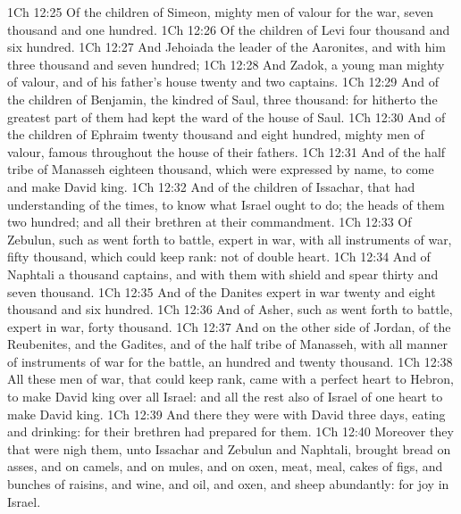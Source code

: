 \vs 1Ch 12:25 Of the children of Simeon, mighty men of valour for the war, seven thousand and one hundred.
\vs 1Ch 12:26 Of the children of Levi four thousand and six hundred.
\vs 1Ch 12:27 And Jehoiada  the leader of the Aaronites, and with him  three thousand and seven hundred;
\vs 1Ch 12:28 And Zadok, a young man mighty of valour, and of his father's house twenty and two captains.
\vs 1Ch 12:29 And of the children of Benjamin, the kindred of Saul, three thousand: for hitherto the greatest part of them had kept the ward of the house of Saul.
\vs 1Ch 12:30 And of the children of Ephraim twenty thousand and eight hundred, mighty men of valour, famous throughout the house of their fathers.
\vs 1Ch 12:31 And of the half tribe of Manasseh eighteen thousand, which were expressed by name, to come and make David king.
\vs 1Ch 12:32 And of the children of Issachar,  that had understanding of the times, to know what Israel ought to do; the heads of them  two hundred; and all their brethren  at their commandment.
\vs 1Ch 12:33 Of Zebulun, such as went forth to battle, expert in war, with all instruments of war, fifty thousand, which could keep rank:  not of double heart.
\vs 1Ch 12:34 And of Naphtali a thousand captains, and with them with shield and spear thirty and seven thousand.
\vs 1Ch 12:35 And of the Danites expert in war twenty and eight thousand and six hundred.
\vs 1Ch 12:36 And of Asher, such as went forth to battle, expert in war, forty thousand.
\vs 1Ch 12:37 And on the other side of Jordan, of the Reubenites, and the Gadites, and of the half tribe of Manasseh, with all manner of instruments of war for the battle, an hundred and twenty thousand.
\vs 1Ch 12:38 All these men of war, that could keep rank, came with a perfect heart to Hebron, to make David king over all Israel: and all the rest also of Israel  of one heart to make David king.
\vs 1Ch 12:39 And there they were with David three days, eating and drinking: for their brethren had prepared for them.
\vs 1Ch 12:40 Moreover they that were nigh them,  unto Issachar and Zebulun and Naphtali, brought bread on asses, and on camels, and on mules, and on oxen,  meat, meal, cakes of figs, and bunches of raisins, and wine, and oil, and oxen, and sheep abundantly: for  joy in Israel.
